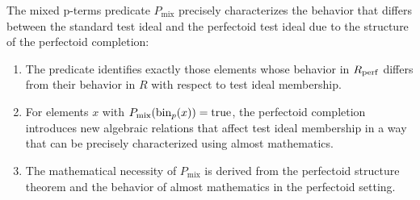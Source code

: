 \begin{theorem}\label{thm:perfectoid-predicate-motivation}
The mixed p-terms predicate $P_{\text{mix}}$ precisely characterizes the behavior that differs between the standard test ideal and the perfectoid test ideal due to the structure of the perfectoid completion:

\begin{enumerate}
    \item The predicate identifies exactly those elements whose behavior in $R_{\operatorname{perf}}$ differs from their behavior in $R$ with respect to test ideal membership.
    
    \item For elements $x$ with $P_{\text{mix}}(\operatorname{bin}_p(x)) = \text{true}$, the perfectoid completion introduces new algebraic relations that affect test ideal membership in a way that can be precisely characterized using almost mathematics.
    
    \item The mathematical necessity of $P_{\text{mix}}$ is derived from the perfectoid structure theorem and the behavior of almost mathematics in the perfectoid setting.
\end{enumerate}
\end{theorem}

